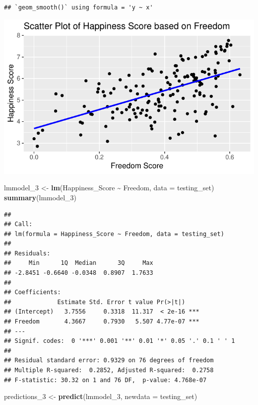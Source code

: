 \documentclass[
  11pt,
]{article}
\newenvironment{Shaded}{\begin{snugshade}}{\end{snugshade}}
\newcommand{\AttributeTok}[1]{\textcolor[rgb]{0.13,0.29,0.53}{#1}}
\newcommand{\FunctionTok}[1]{\textcolor[rgb]{0.13,0.29,0.53}{\textbf{#1}}}
\newcommand{\NormalTok}[1]{#1}
\newcommand{\OtherTok}[1]{\textcolor[rgb]{0.56,0.35,0.01}{#1}}
\newcommand{\SpecialCharTok}[1]{\textcolor[rgb]{0.81,0.36,0.00}{\textbf{#1}}}
\begin{document}
\begin{verbatim}
## `geom_smooth()` using formula = 'y ~ x'
\end{verbatim}

\begin{center}\includegraphics[width=0.7\linewidth]{Group_project_2_files/figure-latex/unnamed-chunk-53-1} \end{center}

\begin{Shaded}
\begin{Highlighting}[]
\NormalTok{lmmodel\_3 }\OtherTok{\textless{}{-}} \FunctionTok{lm}\NormalTok{(Happiness\_Score }\SpecialCharTok{\textasciitilde{}}\NormalTok{ Freedom, }\AttributeTok{data =}\NormalTok{ testing\_set)}
\FunctionTok{summary}\NormalTok{(lmmodel\_3)}
\end{Highlighting}
\end{Shaded}

\begin{verbatim}
## 
## Call:
## lm(formula = Happiness_Score ~ Freedom, data = testing_set)
## 
## Residuals:
##     Min      1Q  Median      3Q     Max 
## -2.8451 -0.6640 -0.0348  0.8907  1.7633 
## 
## Coefficients:
##             Estimate Std. Error t value Pr(>|t|)    
## (Intercept)   3.7556     0.3318  11.317  < 2e-16 ***
## Freedom       4.3667     0.7930   5.507 4.77e-07 ***
## ---
## Signif. codes:  0 '***' 0.001 '**' 0.01 '*' 0.05 '.' 0.1 ' ' 1
## 
## Residual standard error: 0.9329 on 76 degrees of freedom
## Multiple R-squared:  0.2852, Adjusted R-squared:  0.2758 
## F-statistic: 30.32 on 1 and 76 DF,  p-value: 4.768e-07
\end{verbatim}

\begin{Shaded}
\begin{Highlighting}[]
\NormalTok{predictions\_3 }\OtherTok{\textless{}{-}} \FunctionTok{predict}\NormalTok{(lmmodel\_3, }\AttributeTok{newdata =}\NormalTok{ testing\_set)}
\end{Highlighting}
\end{Shaded}
\end{document}
